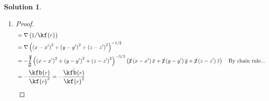 \documentclass[10pt]{article}
\theoremstyle{definition}
\newtheorem{soln}{Solution}
\newcommand{\ux}{\hat{x}}
\newcommand{\uy}{\hat{y}}
\newcommand{\uz}{\hat{z}}
\newcommand{\primed}[1]{#1^\prime}
\newcommand{\scriptr}{\fontsize{12pt}{12pt}\kf{r}}
\newcommand{\bscriptr}{\fontsize{12pt}{12pt}\kfb{r}}
\begin{document}
\begin{soln}
\begin{enumerate}[label=(\alph*)]
\begin{proof}
\begin{align*}
               & =\vec{k}\hat{\bscriptr}\exp\left(k\scriptr\right)\qedhere
            \end{align*}
          \end{proof}
    \item \begin{proof}
            \begin{align*}
               & = \nabla \left(1/\scriptr\right)                                                                                                                                \\
               & = \nabla \left(\left(x-\primed{x}\right)^2 + \left(y-\primed{y}\right)^2+ \left(z-\primed{z}\right)^2\right)^{-1/2}                                             \\
               & = -\cancel{\frac{1}{2}}\left(\left(x-\primed{x}\right)^2 + \left(y-\primed{y}\right)^2+ \left(z-\primed{z}\right)^2\right)^{-3/2}
              \left(\cancel{2}\left(x-\primed{x}\right)\ux + \cancel{2}\left(y-\primed{y}\right)\uy+ \cancel{2}\left(z-\primed{z}\right)\uz\right) \quad \text{By chain rule...} \\
               & = -\frac{\bscriptr}{\scriptr^3}=-\frac{\hat{\bscriptr}}{\scriptr^2}\qedhere
            \end{align*}
          \end{proof}
  \end{enumerate}
\end{soln}
\newpage
\end{document}
